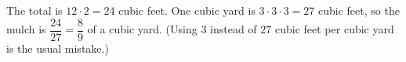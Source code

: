 The total is $12\cdot2=24$ cubic feet. One cubic yard is $3\cdot3\cdot3=27$ cubic feet, so the mulch is $\dfrac{24}{27}=\boxed{\dfrac{8}{9}}$ of a cubic yard. (Using $3$ instead of $27$ cubic feet per cubic yard is the usual mistake.)
